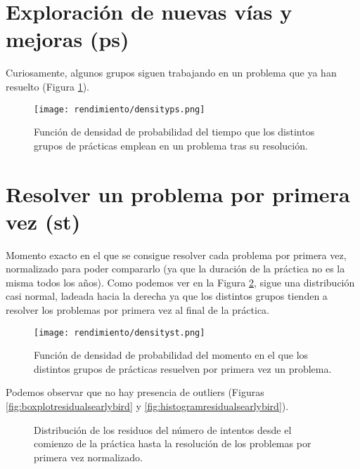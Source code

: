 \section{Exploración de nuevas vías y mejoras (ps)}

Curiosamente, algunos grupos siguen trabajando en un problema que ya han resuelto (Figura \ref{fig:densityplotps}).

\begin{figure}[H]
    \centering
    \texttt{[image: rendimiento/densityps.png]}
    \caption{Función de densidad de probabilidad del tiempo que los distintos grupos de prácticas emplean en un problema tras su resolución.}
    \label{fig:densityplotps}
\end{figure}

\section{Resolver un problema por primera vez (st)}

Momento exacto en el que se consigue resolver cada problema por primera vez, normalizado para poder compararlo (ya que la duración de la práctica no es la misma todos los años). Como podemos ver en la Figura \ref{fig:densityplotearlybird}, sigue una distribución casi normal, ladeada hacia la derecha ya que los distintos grupos tienden a resolver los problemas por primera vez al final de la práctica.

\begin{figure}[H]
    \centering
    \texttt{[image: rendimiento/densityst.png]}
    \caption{Función de densidad de probabilidad del momento en el que los distintos grupos de prácticas resuelven por primera vez un problema.}
    \label{fig:densityplotearlybird}
\end{figure}

Podemos observar que no hay presencia de outliers (Figuras \ref{fig:boxplotresidualsearlybird} y \ref{fig:histogramresidualsearlybird}).

\begin{figure}[H]
\centering
{}\qquad
{}
\caption{Distribución de los residuos del número de intentos desde el comienzo de la práctica hasta la resolución de los problemas por primera vez normalizado.}
\label{fig:earlybird}
\end{figure}

